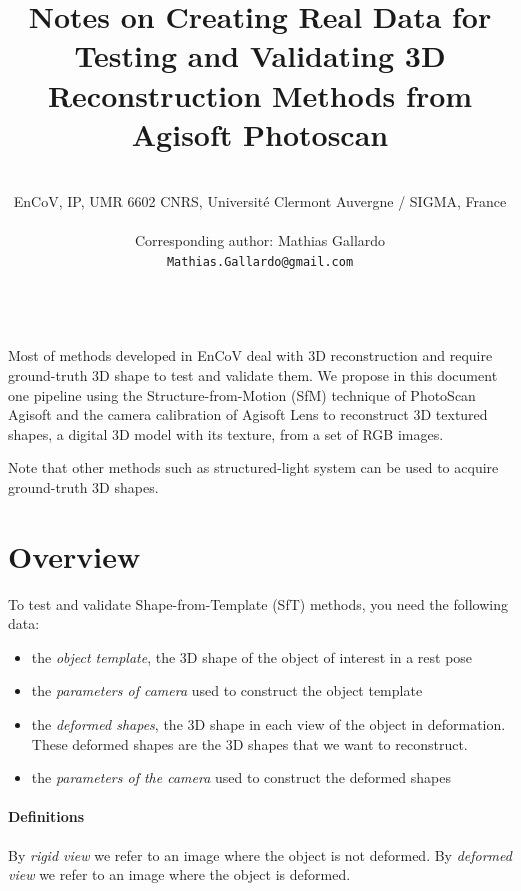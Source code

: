 \documentclass[11pt]{article}
\title{Notes on Creating Real Data for Testing and Validating 3D Reconstruction Methods from Agisoft Photoscan}
\author{
~\\
EnCoV, IP, UMR 6602 CNRS, Universit\'e Clermont Auvergne / SIGMA, France \\
~\\
Corresponding author: Mathias Gallardo\\
{\tt Mathias.Gallardo@gmail.com}\\
~\\
}
\begin{document}
\maketitle
\thispagestyle{empty}

Most of methods developed in EnCoV deal with 3D reconstruction and require ground-truth 3D shape to test and validate them.
We propose in this document one pipeline using the Structure-from-Motion (SfM) technique of PhotoScan Agisoft and the camera calibration of Agisoft Lens to reconstruct 3D textured shapes, \ie a digital 3D model with its texture, from a set of RGB images.

Note that other methods such as structured-light system can be used to acquire ground-truth 3D shapes.

\newpage
\tableofcontents
\newpage

\section{Overview}

To test and validate Shape-from-Template (SfT) methods, you need the following data:
\begin{itemize}
\item the \textit{object template}, the 3D shape of the object of interest in a rest pose
\item the \textit{parameters of camera} used to construct the object template
\item the \textit{deformed shapes}, the 3D shape in each view of the object in deformation. These deformed shapes are the 3D shapes that we want to reconstruct.
\item the \textit{parameters of the camera} used to construct the deformed shapes
\end{itemize}

\paragraph{Definitions}
By \emph{rigid view} we refer to an image where the object is not deformed.
By \emph{deformed view} we refer to an image where the object is deformed.
\end{document}
